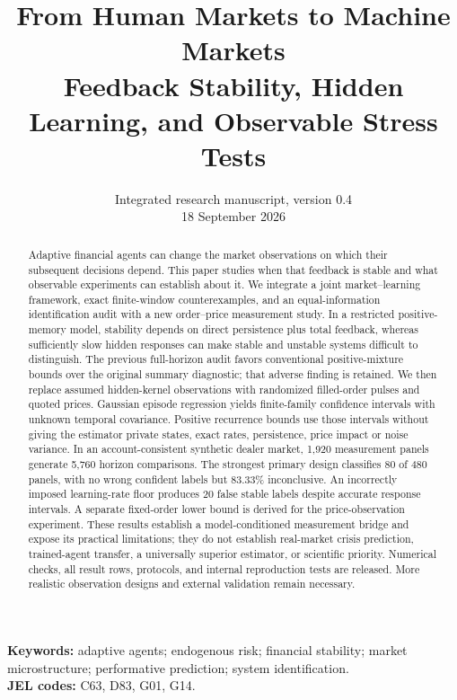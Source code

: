 \documentclass[11pt,a4paper]{article}
\title{\textbf{From Human Markets to Machine Markets}\\[0.45em]
\large Feedback Stability, Hidden Learning, and Observable Stress Tests}
\author{}
\date{Integrated research manuscript, version 0.4\\18 September 2026}
\theoremstyle{definition}
\theoremstyle{remark}
\begin{document}
\maketitle
\vspace{-1.4em}
\begin{abstract}
Adaptive financial agents can change the market observations on which their subsequent decisions depend. This paper studies when that feedback is stable and what observable experiments can establish about it. We integrate a joint market--learning framework, exact finite-window counterexamples, and an equal-information identification audit with a new order--price measurement study. In a restricted positive-memory model, stability depends on direct persistence plus total feedback, whereas sufficiently slow hidden responses can make stable and unstable systems difficult to distinguish. The previous full-horizon audit favors conventional positive-mixture bounds over the original summary diagnostic; that adverse finding is retained. We then replace assumed hidden-kernel observations with randomized filled-order pulses and quoted prices. Gaussian episode regression yields finite-family confidence intervals with unknown temporal covariance. Positive recurrence bounds use those intervals without giving the estimator private states, exact rates, persistence, price impact or noise variance. In an account-consistent synthetic dealer market, 1,920 measurement panels generate 5,760 horizon comparisons. The strongest primary design classifies 80 of 480 panels, with no wrong confident labels but 83.33\% inconclusive. An incorrectly imposed learning-rate floor produces 20 false stable labels despite accurate response intervals. A separate fixed-order lower bound is derived for the price-observation experiment. These results establish a model-conditioned measurement bridge and expose its practical limitations; they do not establish real-market crisis prediction, trained-agent transfer, a universally superior estimator, or scientific priority. Numerical checks, all result rows, protocols, and internal reproduction tests are released. More realistic observation designs and external validation remain necessary.
\end{abstract}
\noindent\textbf{Keywords:} adaptive agents; endogenous risk; financial stability; market microstructure; performative prediction; system identification.\\
\textbf{JEL codes:} C63, D83, G01, G14.

\begin{center}
\end{center}
\end{document}
